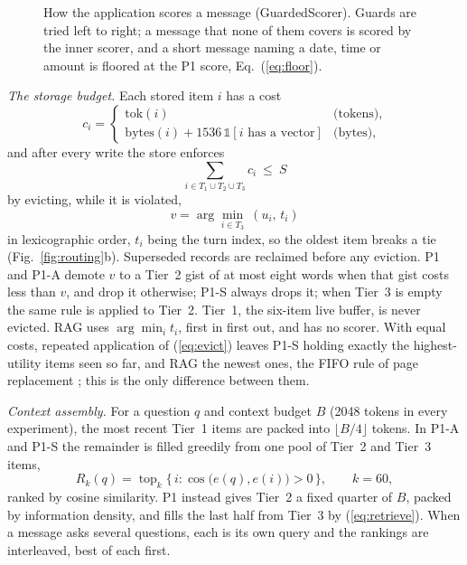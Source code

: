 \begin{figure}[t]
\centering
{}
\caption{How the application scores a message (GuardedScorer). Guards are
tried left to right; a message that none of them covers is scored by the
inner scorer, and a short message naming a date, time or amount is floored
at the P1 score, Eq.~(\ref{eq:floor}).}
\label{fig:scoring}
\end{figure}

\emph{The storage budget.} Each stored item $i$ has a cost
\begin{equation}
\label{eq:cost}
c_i=\begin{cases}
\mathrm{tok}(i) & \text{(tokens)},\\
\mathrm{bytes}(i)+1536\,\mathbb{1}[i \text{ has a vector}] & \text{(bytes)},
\end{cases}
\end{equation}
and after every write the store enforces
\begin{equation}
\label{eq:budget}
\sum_{i\in T_1\cup T_2\cup T_3} c_i\ \le\ S
\end{equation}
by evicting, while it is violated,
\begin{equation}
\label{eq:evict}
v=\arg\min_{i\in T_3}\ (u_i,\,t_i)
\end{equation}
in lexicographic order, $t_i$ being the turn index, so the oldest item breaks
a tie (Fig.~\ref{fig:routing}b). Superseded records are reclaimed before any
eviction. P1 and P1-A demote $v$ to a Tier~2 gist of at most eight words when
that gist costs less than $v$, and drop it otherwise; P1-S always drops it;
when Tier~3 is empty the same rule is applied to Tier~2. Tier~1, the
six-item live buffer, is never evicted. RAG uses $\arg\min_i t_i$, first in
first out, and has no scorer. With equal costs, repeated application of
(\ref{eq:evict}) leaves P1-S holding exactly the highest-utility items seen so
far, and RAG the newest ones, the FIFO rule of page replacement
\cite{belady1966replacement}; this is the only difference between them.

\emph{Context assembly.} For a question $q$ and context budget $B$ (2048
tokens in every experiment), the most recent Tier~1 items are packed into
$\lfloor B/4\rfloor$ tokens. In P1-A and P1-S the remainder is filled
greedily from one pool of Tier~2 and Tier~3 items,
\begin{equation}
\label{eq:retrieve}
R_k(q)=\operatorname{top}_k\big\{\,i : \cos\!\big(e(q),e(i)\big)>0\,\big\},\qquad k=60,
\end{equation}
ranked by cosine similarity. P1 instead gives Tier~2 a fixed quarter of $B$,
packed by information density, and fills the last half from Tier~3 by
(\ref{eq:retrieve}). When a message asks several questions, each is its own
query and the rankings are interleaved, best of each first.

